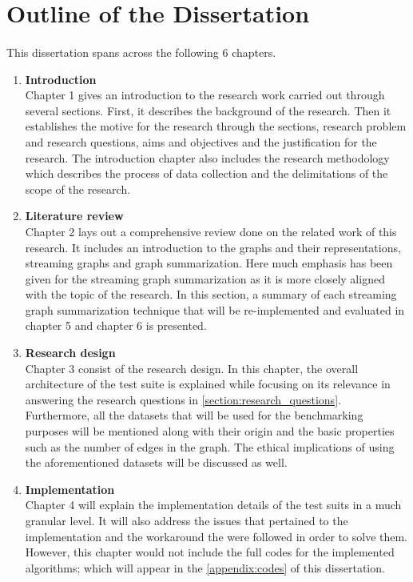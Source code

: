 \section{Outline of the Dissertation}

\paragraph{}
This dissertation spans across the following 6 chapters.

\begin{enumerate}
    \item \textbf{Introduction}\\
          Chapter 1 gives an introduction to the research work carried out through several sections. First, it describes the background of the research. Then it establishes the motive for the research through the sections, research problem and research questions, aims and objectives and the justification for the research. The introduction chapter also includes the research methodology which describes the process of data collection and the delimitations of the scope of the research.

    \item \textbf{Literature review}\\
          Chapter 2 lays out a comprehensive review done on the related work of this research. It includes an introduction to the graphs and their representations, streaming graphs and graph summarization. Here much emphasis has been given for the streaming graph summarization as it is more closely aligned with the topic of the research. In this section, a summary of each streaming graph summarization technique that will be re-implemented and evaluated in chapter 5 and chapter 6 is presented.

    \item \textbf{Research design}\\
          Chapter 3 consist of the research design. In this chapter, the overall architecture of the test suite is explained while focusing on its relevance in answering the research questions in \autoref{section:research_questions}. Furthermore, all the datasets that will be used for the benchmarking purposes will be mentioned along with their origin and the basic properties such as the number of edges in the graph. The ethical implications of using the aforementioned datasets will be discussed as well.

    \item \textbf{Implementation}\\
          Chapter 4 will explain the implementation details of the test suits in a much granular level. It will also address the issues that pertained to the implementation and the workaround the were followed in order to solve them. However, this chapter would not include the full codes for the implemented algorithms; which will appear in the \autoref{appendix:codes} of this dissertation.


\end{enumerate}

